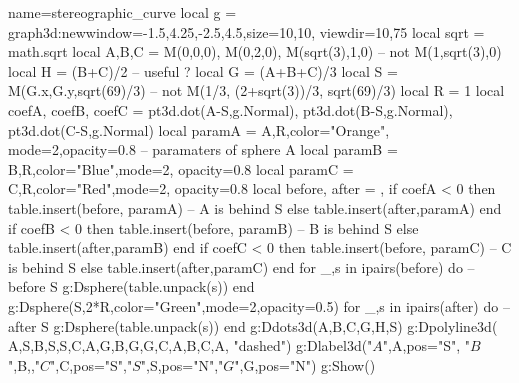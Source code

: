 \documentclass[border=2 mm]{standalone}
\begin{document}
\begin{luadraw}{name=stereographic_curve}
local g = graph3d:new{window={-1.5,4.25,-2.5,4.5},size={10,10}, viewdir={10,75}}
local sqrt = math.sqrt
local A,B,C = M(0,0,0), M(0,2,0), M(sqrt(3),1,0) -- not M(1,sqrt(3),0)
local H = (B+C)/2 -- useful ?
local G = (A+B+C)/3
local S = M(G.x,G.y,sqrt(69)/3) -- not M(1/3, (2+sqrt(3))/3, sqrt(69)/3)
local R = 1
local coefA, coefB, coefC = pt3d.dot(A-S,g.Normal), pt3d.dot(B-S,g.Normal), pt3d.dot(C-S,g.Normal)
local paramA = {A,R,{color="Orange", mode=2,opacity=0.8}}  -- paramaters of sphere A
local paramB = {B,R,{color="Blue",mode=2, opacity=0.8}}
local paramC = {C,R,{color="Red",mode=2, opacity=0.8}}
local before, after = {}, {}
if coefA < 0 then table.insert(before, paramA) -- A is behind S
else table.insert(after,paramA)
end
if coefB < 0 then table.insert(before, paramB) -- B is behind S
else table.insert(after,paramB)
end
if coefC < 0 then table.insert(before, paramC) -- C is behind S
else table.insert(after,paramC)
end
for _,s in ipairs(before) do -- before S
    g:Dsphere(table.unpack(s))
end
g:Dsphere(S,2*R,{color="Green",mode=2,opacity=0.5})  
for _,s in ipairs(after) do -- after S
    g:Dsphere(table.unpack(s))
end
g:Ddots3d({A,B,C,G,H,S})
g:Dpolyline3d( {{A,S},{B,S},{S,C},{A,G},{B,G},{G,C},{A,B,C,A}}, "dashed")
g:Dlabel3d("$A$",A,{pos="S"}, "$B$",B,{},"$C$",C,{pos="S"},"$S$",S,{pos="N"},"$G$",G,{pos="N"})
g:Show()
\end{luadraw}
\end{document}

